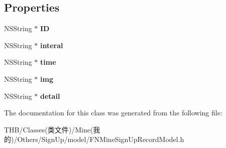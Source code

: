 \subsection*{Properties}
\begin{DoxyCompactItemize}
\item 
\mbox{\label{interface_f_n_mine_sign_up_record_model_a60e800ba2c2fcce043a2b041ef6360e7}} 
N\+S\+String $\ast$ {\bfseries ID}
\item 
\mbox{\label{interface_f_n_mine_sign_up_record_model_a9a6ea7f3c05d808a740de2370c9c2669}} 
N\+S\+String $\ast$ {\bfseries interal}
\item 
\mbox{\label{interface_f_n_mine_sign_up_record_model_a36cebd7bbc2fbb76b4e4043cc52d44e7}} 
N\+S\+String $\ast$ {\bfseries time}
\item 
\mbox{\label{interface_f_n_mine_sign_up_record_model_a6dea82b476e03912fe464261e62f613e}} 
N\+S\+String $\ast$ {\bfseries img}
\item 
\mbox{\label{interface_f_n_mine_sign_up_record_model_ad28618dd276da5e8e2c12d84bbb84865}} 
N\+S\+String $\ast$ {\bfseries detail}
\end{DoxyCompactItemize}


The documentation for this class was generated from the following file\+:\begin{DoxyCompactItemize}
\item 
T\+H\+B/\+Classes(类文件)/\+Mine(我的)/\+Others/\+Sign\+Up/model/F\+N\+Mine\+Sign\+Up\+Record\+Model.\+h\end{DoxyCompactItemize}
